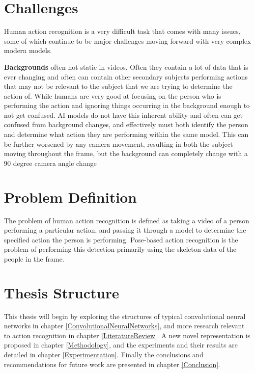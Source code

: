 \section{Challenges}
\label{sec:challenges}

Human action recognition is a very difficult task that comes with many issues, some of which continue to be major challenges moving forward with very complex modern models.

\textbf{Backgrounds} often not static in videos. Often they contain a lot of data that is ever changing and often can contain other secondary subjects performing actions that may not be relevant to the subject that we are trying to determine the action of. While humans are very good at focusing on the person who is performing the action and ignoring things occurring in the background enough to not get confused. AI models do not have this inherent ability and often can get confused from background changes, and effectively must both identify the person and determine what action they are performing within the same model. This can be further worsened by any camera movement, resulting in both the subject moving throughout the frame, but the background can completely change with a  90 degree camera angle change

\section{Problem Definition}

The problem of human action recognition is defined as taking a video of a person performing a particular action, and passing it through a model to determine the specified action the person is performing. Pose-based action recognition is the problem of performing this detection primarily using the skeleton data of the people in the frame.

\section{Thesis Structure}

This thesis will begin by exploring the structures of typical convolutional neural networks in chapter \ref{ConvolutionalNeuralNetworks}, and more research relevant to action recognition in chapter \ref{LiteratureReview}. A new novel representation is proposed in chapter \ref{Methodology}, and the experiments and their results are detailed in chapter \ref{Experimentation}. Finally the conclusions and recommendations for future work are presented in chapter \ref{Conclusion}.